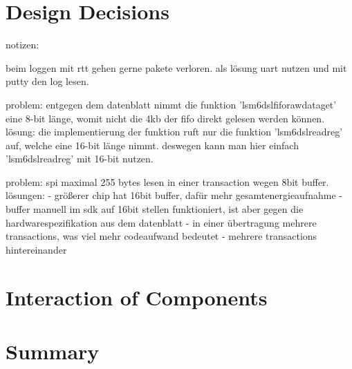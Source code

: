 \section{Design Decisions}

notizen:

beim loggen mit rtt gehen gerne pakete verloren. als lösung uart nutzen und mit putty den log lesen.

problem: entgegen dem datenblatt nimmt die funktion 'lsm6dsl\textunderscore fifo\textunderscore raw\textunderscore data\textunderscore get' eine 8-bit länge, womit nicht die 4kb der fifo direkt gelesen werden können.
lösung:
die implementierung der funktion ruft nur die funktion 'lsm6dsl\textunderscore read\textunderscore reg' auf, welche eine 16-bit länge nimmt. deswegen kann man hier einfach 'lsm6dsl\textunderscore read\textunderscore reg' mit 16-bit nutzen.

problem: spi maximal 255 bytes lesen in einer transaction wegen 8bit buffer.
lösungen:
- größerer chip hat 16bit buffer, dafür mehr gesamtenergieaufnahme
- buffer manuell im sdk auf 16bit stellen funktioniert, ist aber gegen die hardwarespezifikation aus dem datenblatt
- in einer übertragung mehrere transactions, was viel mehr codeaufwand bedeutet
- mehrere transactions hintereinander



\section{Interaction of Components}

\section{Summary}

